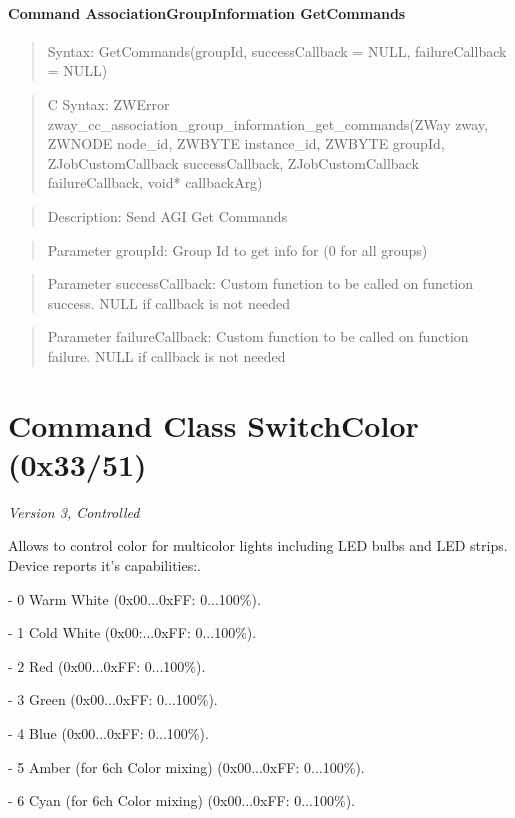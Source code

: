 \paragraph{Command AssociationGroupInformation GetCommands}
\begin{quote}Syntax: GetCommands(groupId, successCallback = NULL, failureCallback = NULL)\end{quote}
\begin{quote}C Syntax: ZWError zway\_cc\_association\_group\_information\_get\_commands(ZWay zway, ZWNODE node\_id, ZWBYTE instance\_id, ZWBYTE groupId, ZJobCustomCallback successCallback, ZJobCustomCallback failureCallback, void* callbackArg)\end{quote}
\begin{quote}Description: Send AGI Get Commands\end{quote}
\begin{quote}Parameter groupId: Group Id to get info for (0 for all groups)\end{quote}
\begin{quote}Parameter successCallback: Custom function to be called on function success. NULL if callback is not needed\end{quote}
\begin{quote}Parameter failureCallback: Custom function to be called on function failure. NULL if callback is not needed\end{quote}



\section{Command Class SwitchColor (0x33/51)}

\textit{Version 3, Controlled}
\newline

Allows to control color for multicolor lights including LED bulbs and LED strips. Device reports it's capabilities:. 

- 0 Warm White (0x00...0xFF: 0...100\%). 

- 1 Cold White (0x00:...0xFF: 0...100\%). 

- 2 Red (0x00...0xFF: 0...100\%). 

- 3 Green (0x00...0xFF: 0...100\%). 

- 4 Blue (0x00...0xFF: 0...100\%). 

- 5 Amber (for 6ch Color mixing) (0x00...0xFF: 0...100\%). 

- 6 Cyan (for 6ch Color mixing) (0x00...0xFF: 0...100\%). 

